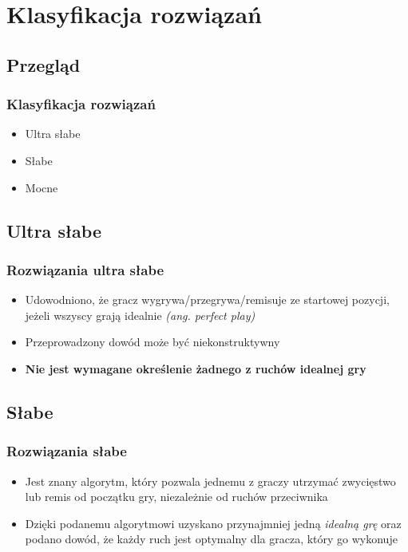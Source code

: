 \documentclass[polish,envcountsect,10pt]{beamer}
\begin{document}
    \section{Klasyfikacja rozwiązań}
        \subsection{Przegląd}
            \begin{frame}
                \frametitle{Klasyfikacja rozwiązań}
                \begin{itemize}
                    \item<1-> Ultra słabe
                    \item<2-> Słabe
                    \item<3-> Mocne
                \end{itemize}
            \end{frame}
        \subsection{Ultra słabe}
            \begin{frame}
                \frametitle{Rozwiązania ultra słabe}
                \begin{itemize}
                    \item<1-> Udowodniono, że gracz wygrywa/przegrywa/remisuje ze startowej pozycji, jeżeli wszyscy grają idealnie \textit{(ang. perfect play)}
                    \item<2-> Przeprowadzony dowód może być niekonstruktywny
                    \item<3-> \textbf{Nie jest wymagane określenie żadnego z ruchów idealnej gry}
                \end{itemize}
            \end{frame}
            
        \subsection{Słabe}
            \begin{frame}
                \frametitle{Rozwiązania słabe}
                \begin{itemize}
                    \item<1-> Jest znany algorytm, który pozwala jednemu z graczy utrzymać zwycięstwo lub remis od początku gry, niezależnie od ruchów przeciwnika
                    \item<2-> Dzięki podanemu algorytmowi uzyskano przynajmniej jedną \textit{idealną grę} oraz podano dowód, że każdy ruch jest optymalny dla gracza, który go wykonuje                    
                \end{itemize}     
            \end{frame}
\end{document}
